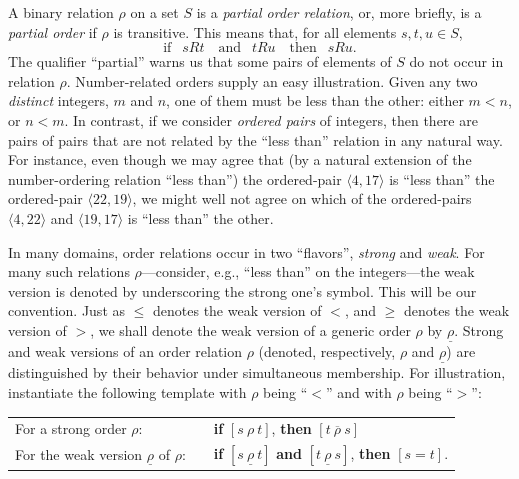 A binary relation $\rho$ on a set $S$ is a {\it partial order
  relation}, or, more briefly, is a
{\it partial order} if $\rho$ is transitive. This means that, for all elements $s, t, u \in S$,
\begin{equation}
\label{eq:def-transitive}
\mbox{if } \ \ sRt \ \ \ \mbox{ and } \ \ tRu \ \ \ \mbox{ then }
\  \ sRu.
\end{equation}
The qualifier ``partial'' warns us that some pairs of elements of $S$
do not occur in relation $\rho$.  Number-related orders supply an easy
illustration.  Given any two {\em distinct} integers, $m$ and $n$, one
of them must be less than the other: either $m < n$, or $n < m$.  In
contrast, if we consider {\it ordered pairs} of integers, then there
are pairs of pairs that are not related by the ``less than'' relation
in any natural way.  For instance, even though we may agree that (by a
natural extension of the number-ordering relation ``less than'') the
ordered-pair $\langle 4, 17 \rangle$ is ``less than'' the ordered-pair
$\langle 22, 19 \rangle$, we might well not agree on which of the
ordered-pairs $\langle 4, 22 \rangle$ and $\langle 19, 17 \rangle$ is
``less than'' the other.


In many domains, order relations occur in two ``flavors'', {\em
  strong} and {\em weak}. For
many such relations $\rho$---consider, e.g., ``less than'' on the
integers---the weak version is denoted by underscoring the strong
one's symbol.  This will be our convention.  Just as $\leq$ denotes
the weak version of $<$, and $\geq$ denotes the weak version of $>$,
we shall denote the weak version of a generic order $\rho$ by
$\underline{\rho}$.
Strong and weak versions of an order relation $\rho$ (denoted,
respectively, $\rho$ and $\underline{\rho}$) are distinguished by
their behavior under simultaneous membership.  For illustration,
instantiate the following template with $\rho$ being ``$<$'' and with
$\rho$ being ``$>$'':

\smallskip

\begin{tabular}{lll}
For a strong order $\rho$: & &
{\bf if} $[s \ \rho \ t]$, {\bf then} $[t \ \overline{\rho} \ s]$ \\
For the weak version $\underline{\rho}$ of $\rho$: & &
{\bf if} $[s \ \underline{\rho} \ t]$ {\bf and} $[t \ \underline{\rho}
  \ s]$, {\bf then} $[s = t]$.
\end{tabular}

